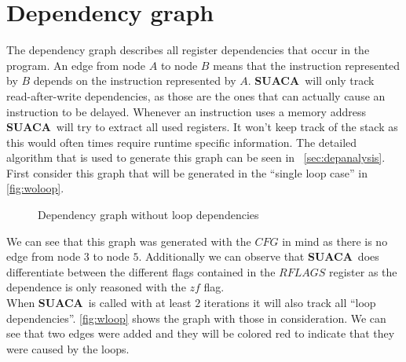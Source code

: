 \documentclass[a4paper,12pt,titlepage, twoside]{report}
\newcommand{\suaca}{\textbf{SUACA}}
\begin{document}
\FloatBarrier

\section{Dependency graph}
The dependency graph describes all register dependencies that occur in the program. An edge from node $A$ to node $B$ means that the instruction represented by $B$ depends on the instruction represented by $A$. \suaca\ will only track read-after-write dependencies, as those are the ones that can actually cause an instruction to be delayed. Whenever an instruction uses a memory address \suaca\ will try to extract all used registers. It won't keep track of the stack as this would often times require runtime specific information. The detailed algorithm that is used to generate this graph can be seen in ~\autoref{sec:depanalysis}. First consider this graph that will be generated in the ``single loop case'' in \autoref{fig:woloop}.\\


\begin{figure}
\centering
{}
\caption{Dependency graph without loop dependencies}
\label{fig:woloop}
\end{figure}


We can see that this graph was generated with the $CFG$ in mind as there is no edge from node $3$ to node $5$. Additionally we can observe that \suaca\ does differentiate between the different flags contained in the $RFLAGS$ register as the dependence is only reasoned with the $zf$ flag.\\
When \suaca\ is called with at least $2$ iterations it will also track all ``loop dependencies''. \autoref{fig:wloop} shows the graph with those in consideration. We can see that two edges were added and they will be colored red to indicate that they were caused by the loops.
\end{document}
